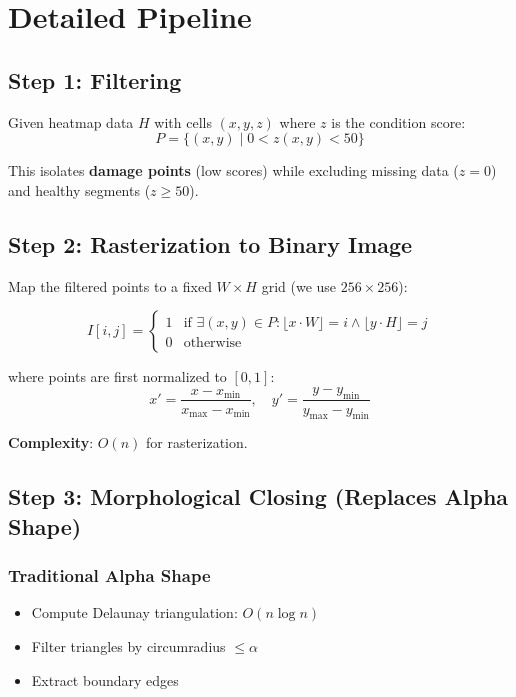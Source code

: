 \documentclass[11pt]{article}
\begin{document}
\section{Detailed Pipeline}

\subsection{Step 1: Filtering}

Given heatmap data $H$ with cells $(x, y, z)$ where $z$ is the condition score:
\begin{equation}
    P = \{(x, y) \mid 0 < z(x,y) < 50\}
\end{equation}

This isolates \textbf{damage points} (low scores) while excluding missing data ($z = 0$) and healthy segments ($z \geq 50$).

\subsection{Step 2: Rasterization to Binary Image}

Map the filtered points to a fixed $W \times H$ grid (we use $256 \times 256$):

\begin{equation}
    I[i,j] = \begin{cases}
        1 & \text{if } \exists (x,y) \in P : \lfloor x \cdot W \rfloor = i \land \lfloor y \cdot H \rfloor = j \\
        0 & \text{otherwise}
    \end{cases}
\end{equation}

where points are first normalized to $[0, 1]$:
\begin{equation}
    x' = \frac{x - x_{\min}}{x_{\max} - x_{\min}}, \quad
    y' = \frac{y - y_{\min}}{y_{\max} - y_{\min}}
\end{equation}

\textbf{Complexity}: $O(n)$ for rasterization.

\subsection{Step 3: Morphological Closing (Replaces Alpha Shape)}

\subsubsection{Traditional Alpha Shape}
\begin{itemize}
    \item Compute Delaunay triangulation: $O(n \log n)$
    \item Filter triangles by circumradius $\leq \alpha$
    \item Extract boundary edges
\end{itemize}
\end{document}
